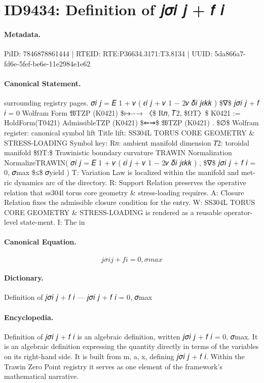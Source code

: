 \section*{ID9434: Definition of 𝑗𝜎𝑖 𝑗 + 𝑓 𝑖}
\paragraph{Metadata.}
PiID: 7846878861444 | RTEID: RTE:P36634.3171:T3.8134 | UUID: 5da866a7-fd6e-5fef-be6e-11e2984e1e62

\paragraph{Canonical Statement.}
surrounding registry pages. 𝜎𝑖 𝑗 = 𝐸 1 + 𝜈 ( 𝜖𝑖 𝑗 + 𝜈 1 − 2𝜈 𝛿𝑖 𝑗𝜖𝑘𝑘 ) \$∇\$ 𝑗𝜎𝑖 𝑗 + 𝑓 𝑖 = 0 Wolfram Form 𝔚TZP (K0421) \$↦−→ 〈\$ R𝑛, 𝑇2, \$ΩT〉\$ K0421 := HoldForm(T0421) AdmissibleTZP (K0421) \$⇐⇒\$ 𝔚TZP (K0421) . \$∅\$ Wolfram register: canonical symbol lift Title lift: SS304L TORUS CORE GEOMETRY \& STRESS-LOADING Symbol key: R𝑛: ambient manifold dimension 𝑇2: toroidal manifold \$ΩT:\$ Trawinistic boundary curvature TRAWIN Normalization NormalizeTRAWIN( 𝜎𝑖 𝑗 = 𝐸 1 + 𝜈 ( 𝜖𝑖 𝑗 + 𝜈 1 − 2𝜈 𝛿𝑖 𝑗𝜖𝑘𝑘 ) , \$∇\$ 𝑗𝜎𝑖 𝑗 + 𝑓 𝑖 = 0, 𝜎max \$≤\$ 𝜎yield ) T: Variation Law is localized within the manifold and met-ric dynamics arc of the directory. R: Support Relation preserves the operative relation that ss304l torus core geometry \& stress-loading requires. A: Closure Relation fixes the admissible closure condition for the entry. W: SS304L TORUS CORE GEOMETRY \& STRESS-LOADING is rendered as a reusable operator-level state-ment. I: The in

\paragraph{Canonical Equation.}
\[
𝑗𝜎𝑖 𝑗 + 𝑓 𝑖 = 0, 𝜎max
\]

\paragraph{Dictionary.}
Definition of 𝑗𝜎𝑖 𝑗 + 𝑓 𝑖 — 𝑗𝜎𝑖 𝑗 + 𝑓 𝑖 = 0, 𝜎max

\paragraph{Encyclopedia.}
Definition of 𝑗𝜎𝑖 𝑗 + 𝑓 𝑖 is an algebraic definition, written 𝑗𝜎𝑖 𝑗 + 𝑓 𝑖 = 0, 𝜎max. It is an algebraic definition expressing the quantity directly in terms of the variables on its right-hand side. It is built from m, a, x, defining 𝑗𝜎𝑖 𝑗 + 𝑓 𝑖. Within the Trawin Zero Point registry it serves as one element of the framework's mathematical narrative.
